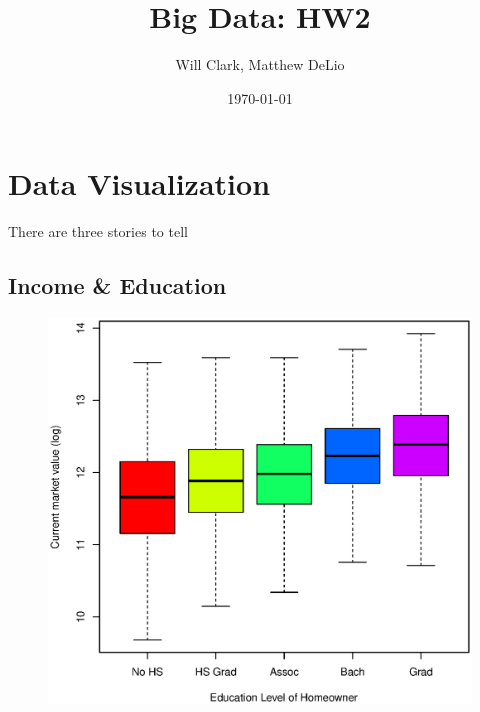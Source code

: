 \documentclass[11pt, fleqn]{article}
\begin{document}
\title{Big Data: HW2}
\author{Will Clark, Matthew DeLio}
\date{\today}
\maketitle

\section{Data Visualization}

There are three stories to tell

\subsection{Income \& Education}
\begin{figure}[!htb]
  \centering
  \includegraphics[scale=.5]{hhgrad.eps}
  \caption{}
  \label{fig:hhgrad}
\end{figure}
\end{document}
